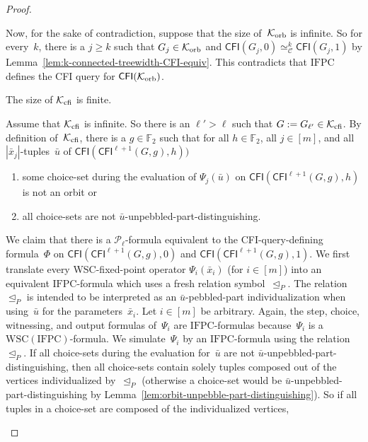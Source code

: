 \documentclass[]{lmcs}
\newcommand{\FF}{\mathbb{F}}
\newcommand{\formA}{\Phi}
\newcommand{\formB}{\Psi}
\newcommand{\tup}[1]{\bar{#1}}
\newcommand{\vertA}{u}
\newcommand{\IFPC}{\ensuremath{\mathrm{IFPC}}}
\newcommand{\CFImk}[2]{\mathsf{CFI}^{#1}(#2)}
\newcommand{\WSCof}[1]{\mathrm{WSC}(#1)}
\newcommand{\CFIsym}{\mathsf{CFI}}
\newcommand{\CFI}[1]{\CFIsym(#1)}
\newcommand{\kequiv}[1]{\simeq^#1_{\mathcal{C}}}
\newcommand{\indRel}{\trianglelefteq}
\newcommand{\Pk}[1]{\mathcal{P}_{#1}}
\newenvironment{claimproof}[1][\proofname]{\begin{claimprooftemp}[#1]\renewcommand*{\qedsymbol}{\(\dashv\)}}{\end{claimprooftemp}}
\begin{document}
\begin{proof}
\begin{claimproof}
		Now, for the sake of contradiction,
		suppose that the size of~$\mathcal{K}_{\text{orb}}$ is infinite.
		So for every~$k$, there is a $j\geq k$ such that $G_j \in \mathcal{K}_{\text{orb}}$
		and $\CFI{G_j,0} \kequiv{k} \CFI{G_j,1}$ by Lemma~\ref{lem:k-connected-treewidth-CFI-equiv}.
		This contradicts that \IFPC{} defines the CFI query for $\CFI{\GraphClassOrb}$.
	\end{claimproof}
	
	\begin{clm}
		\label{clm:cfi-infinite}
		The size of $\mathcal{K}_{\text{cfi}}$ is finite.
	\end{clm}
	\begin{claimproof}
		Assume that $\mathcal{K}_{\text{cfi}}$ is infinite.
		So there is an $\ell' > \ell$ such that $G:=G_{\ell'}\in \mathcal{K}_{\text{cfi}}$.
		By definition of~$\mathcal{K}_{\text{cfi}}$,
		there is a $g \in \FF_2$ such that for all $h \in \FF_2$, all $j \in [m]$, and all $|\tup{x}_j|$-tuples~$\tup{\vertA}$ of $\CFI{\CFImk{\ell+1}{G,g},h})$
		\begin{enumerate}
			\item some choice-set during the evaluation of $\formB_j(\tup{\vertA})$ on $\CFI{\CFImk{\ell+1}{G,g},h}$
			is not an orbit or
			\item all choice-sets are not $\tup{\vertA}$-unpebbled-part-distinguishing.
		\end{enumerate} 
		We claim that there is a $\Pk{\ell}$-formula equivalent to the CFI-query-defining formula~$\formA$
		on $\CFI{\CFImk{\ell+1}{G,g},0}$ and $\CFI{\CFImk{\ell+1}{G,g},1}$.
		We first translate every WSC-fixed-point operator $\formB_i(\tup{x}_i)$
		(for $i \in [m]$)
		into an equivalent \IFPC{}-formula which uses a fresh relation symbol~$\indRel_P$.
		The relation~$\indRel_P$ is intended to be interpreted as an $\tup{\vertA}$-pebbled-part individualization when using~$\tup{\vertA}$ for the parameters~$\tup{x}_i$.
		Let $i \in [m]$ be arbitrary.
		Again, the step, choice, witnessing, and output formulas of~$\formB_i$ are \IFPC{}-formulas because~$\formB_i$ is a $\WSCof{\IFPC}$-formula.
		We simulate~$\formB_i$ by an \IFPC{}-formula using the relation~$\indRel_P$.
		If all choice-sets during the evaluation for~$\tup{\vertA}$
		are not $\tup{\vertA}$-unpebbled-part-distinguishing,
		then all choice-sets contain solely tuples
		composed out of the vertices individualized by~$\indRel_P$
		(otherwise a choice-set would be $\tup{\vertA}$-unpebbled-part-distinguishing by Lemma~\ref{lem:orbit-unpebble-part-distinguishing}).
		So if all tuples in a choice-set are composed of the individualized vertices,

\end{claimproof}
\end{proof}
\end{document}
